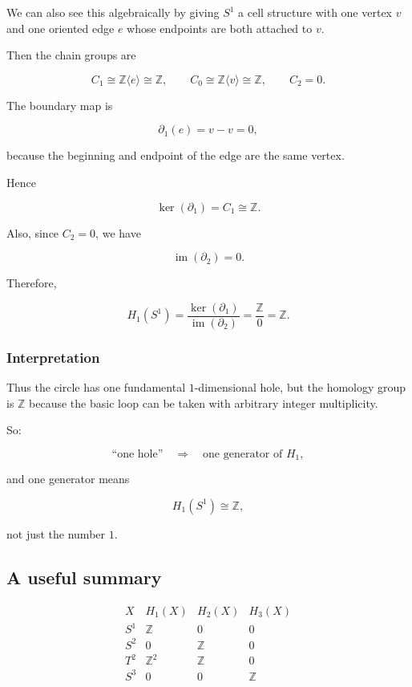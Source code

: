 \documentclass[12pt,a4paper]{article}
\theoremstyle{notespace}
\begin{document}
We can also see this algebraically by giving \(S^1\) a cell structure with one vertex \(v\) and one oriented edge \(e\) whose endpoints are both attached to \(v\).

Then the chain groups are

\[
C_1 \cong \mathbb Z\langle e\rangle \cong \mathbb Z,
\qquad
C_0 \cong \mathbb Z\langle v\rangle \cong \mathbb Z,
\qquad
C_2=0.
\]

The boundary map is

\[
\partial_1(e)=v-v=0,
\]

because the beginning and endpoint of the edge are the same vertex.

Hence

\[
\ker(\partial_1)=C_1\cong \mathbb Z.
\]

Also, since \(C_2=0\), we have

\[
\operatorname{im}(\partial_2)=0.
\]

Therefore,

\[
H_1(S^1)
=
\frac{\ker(\partial_1)}{\operatorname{im}(\partial_2)}
=
\frac{\mathbb Z}{0}
=
\mathbb Z.
\]

\subsubsection{Interpretation}

Thus the circle has one fundamental \(1\)-dimensional hole, but the homology group is \(\mathbb Z\) because the basic loop can be taken with arbitrary integer multiplicity.

So:

\[
\text{``one hole''} \quad \Longrightarrow \quad \text{one generator of } H_1,
\]

and one generator means

\[
H_1(S^1)\cong \mathbb Z,
\]

not just the number \(1\).

\subsection{A useful summary}

\[
\begin{array}{c|c|c|c}
	X & H_1(X) & H_2(X) & H_3(X) \\
	\hline
	S^1 & \mathbb Z & 0 & 0 \\
	S^2 & 0 & \mathbb Z & 0 \\
	T^2 & \mathbb Z^2 & \mathbb Z & 0 \\
	S^3 & 0 & 0 & \mathbb Z
\end{array}
\]
\end{document}
